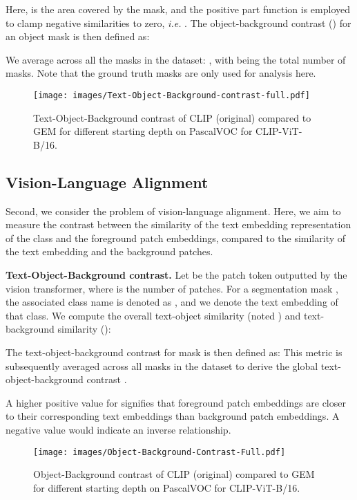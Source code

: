 \documentclass[10pt,twocolumn,letterpaper]{article}
\begin{document}
Here,  is the area covered by the mask, and the positive part function is employed to clamp negative similarities to zero, \textit{i.e.} . The object-background contrast () for an object mask  is then defined as:


We average across all the masks in the dataset: ,
with  being the total number of masks. Note that the ground truth masks are only used for analysis here.


\begin{figure}[t]
\texttt{[image: images/Text-Object-Background-contrast-full.pdf]}
      \vspace{-2em}
     \caption{Text-Object-Background contrast of CLIP (original) compared to GEM for different starting depth on PascalVOC for CLIP-ViT-B/16. }\label{fig:depth_txt_obj_bg_contrast_plots}
     \vspace{-2em}
\end{figure}

\subsection{Vision-Language Alignment} 

Second, we consider the problem of vision-language alignment.
Here, we aim to measure the contrast between the similarity of the text embedding representation of the class and the foreground patch embeddings, compared to the similarity of the text embedding and the background patches.

\noindent \textbf{Text-Object-Background contrast.}
Let  be the patch token outputted by the vision transformer, where  is the number of patches. For a segmentation mask , the associated class name is denoted as , and we denote  the text embedding of that class.
We compute the overall text-object similarity (noted ) and text-background similarity (): 



The text-object-background contrast for mask  is then defined as: 
This metric is subsequently averaged across all masks in the dataset to derive the global text-object-background contrast .

A higher positive value for  signifies that foreground patch embeddings are closer to their corresponding text embeddings than background patch embeddings. A negative value would indicate an inverse relationship.



\begin{figure}[t]
      \texttt{[image: images/Object-Background-Contrast-Full.pdf]}
      \vspace{-2.5em}
     \caption{Object-Background contrast of CLIP (original) compared to GEM for different starting depth on PascalVOC for CLIP-ViT-B/16. }\label{fig:depth_obj_bg_contrast_plots}
     \vspace{-2em}
\end{figure}
\end{document}
